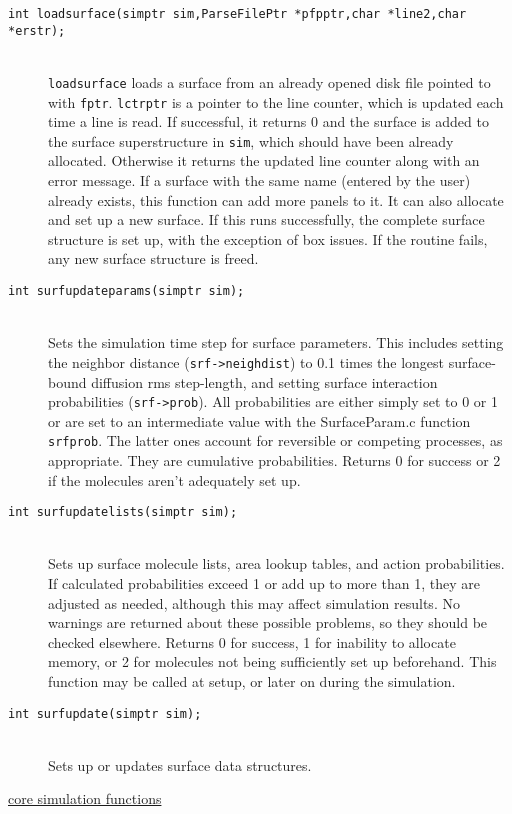 \documentclass {book}
\newcommand {\ttt} {\texttt}
\begin{document}
\begin{description}
\item[\ttt{int loadsurface(simptr sim,ParseFilePtr *pfpptr,char *line2,char *erstr);}]
\hfill \\
\ttt{loadsurface} loads a surface from an already opened disk file pointed to with \ttt{fptr}. \ttt{lctrptr} is a pointer to the line counter, which is updated each time a line is read. If successful, it returns 0 and the surface is added to the surface superstructure in \ttt{sim}, which should have been already allocated. Otherwise it returns the updated line counter along with an error message. If a surface with the same name (entered by the user) already exists, this function can add more panels to it. It can also allocate and set up a new surface. If this runs successfully, the complete surface structure is set up, with the exception of box issues. If the routine fails, any new surface structure is freed.

\item[\ttt{int surfupdateparams(simptr sim);}]
\hfill \\
Sets the simulation time step for surface parameters. This includes setting the neighbor distance (\ttt{srf->neighdist}) to 0.1 times the longest surface-bound diffusion rms step-length, and setting surface interaction probabilities (\ttt{srf->prob}). All probabilities are either simply set to 0 or 1 or are set to an intermediate value with the SurfaceParam.c function \ttt{srfprob}. The latter ones account for reversible or competing processes, as appropriate. They are cumulative probabilities. Returns 0 for success or 2 if the molecules aren't adequately set up.

\item[\ttt{int surfupdatelists(simptr sim);}]
\hfill \\
Sets up surface molecule lists, area lookup tables, and action probabilities. If calculated probabilities exceed 1 or add up to more than 1, they are adjusted as needed, although this may affect simulation results. No warnings are returned about these possible problems, so they should be checked elsewhere. Returns 0 for success, 1 for inability to allocate memory, or 2 for molecules not being sufficiently set up beforehand. This function may be called at setup, or later on during the simulation.

\item[\ttt{int surfupdate(simptr sim);}]
\hfill \\
Sets up or updates surface data structures.

\item[\underline{core simulation functions}]


\end{description}
\end{document}
